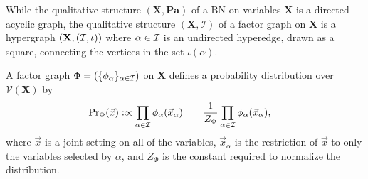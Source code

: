 \documentclass{article}
\newcommand{\V}{\mathcal V}
\newcommand{\N}{\mathcal N}
\newcommand{\Ed}{\mathcal E}
\numberwithin{equation}{section}
\begin{document}
	While the qualitative structure $(\mathbf X, \mathbf{Pa})$ of a BN on variables $\mathbf X$ is a directed acyclic graph, the qualitative structure $(\mathbf X, \mathcal I)$ of a factor graph on $\mathbf X$ is
	a hypergraph $(\mathbf X, (\cal I, \iota))$ where
        $\alpha \in \cal I$ is an undirected hyperedge, drawn as a
        square, connecting the vertices in the set $\iota(\alpha)$.  
	
	
	
	
	A factor graph $\Phi = (\{\phi_\alpha\}_{\alpha \in \cal I})$ on $\mathbf X$ defines a probability distribution over $\V(\mathbf X)$ by 
	\begin{align*}
		\Pr\nolimits_\Phi(\vec x) &:\propto \prod_{\alpha \in \cal I} \phi_\alpha(\vec x_{\alpha}) 
		~~= \frac{1}{Z_\Phi} \prod_{\alpha \in \cal I}
                                \phi_\alpha(\vec x_{\alpha}), 
	\end{align*}
	where $\vec{x}$ is a joint setting on all of the variables, $\vec{x}_\alpha$ is the restriction of $\vec{x}$ to only the variables selected by $\alpha$, and $Z_\Phi$ is the constant required to normalize the distribution. 
		
\end{document}
